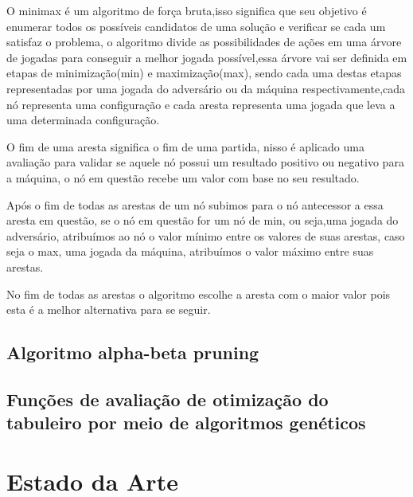 O minimax é um algoritmo de força bruta,isso significa que seu objetivo é enumerar todos os possíveis candidatos de uma
solução e verificar se cada um satisfaz o problema, o algoritmo divide as possibilidades de ações em uma árvore de jogadas
para conseguir a melhor jogada possível,essa árvore vai ser definida em etapas de minimização(min) e maximização(max),
sendo cada uma destas etapas representadas por uma jogada do adversário ou da máquina respectivamente,cada nó representa
uma configuração e cada aresta representa uma jogada que leva a uma determinada configuração.

O fim de uma aresta significa o fim de uma partida, nisso é aplicado uma avaliação para validar se aquele nó possui
um resultado positivo ou negativo para a máquina, o nó em questão recebe um valor com base no seu resultado.

Após o fim de todas as arestas de um nó subimos para o nó antecessor a essa aresta em questão, se o nó em questão for um nó
de min, ou seja,uma jogada do adversário, atribuímos ao nó o valor mínimo entre os valores de suas arestas, caso seja o max,
uma jogada da máquina, atribuímos o valor máximo entre suas arestas.

No fim de todas as arestas o algoritmo escolhe a aresta com o maior valor pois esta é a melhor alternativa para se seguir.

\subsection{Algoritmo alpha-beta pruning}

\subsection{Funções de avaliação de otimização do tabuleiro por meio de algoritmos genéticos}

\section{Estado da Arte}
